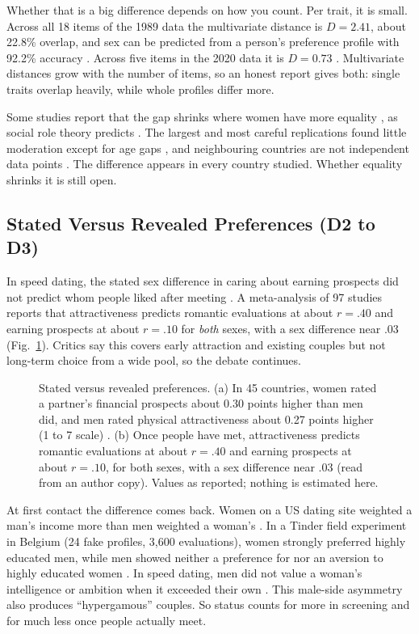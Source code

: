 \documentclass[conference,a4paper]{IEEEtran}
\begin{document}
Whether that is a big difference depends on how you count. Per trait, it is small. Across all 18 items of the 1989 data the multivariate distance is $D=2.41$, about 22.8\% overlap, and sex can be predicted from a person's preference profile with 92.2\% accuracy \cite{conroybeam2015}. Across five items in the 2020 data it is $D=0.73$ \cite{walter2020}. Multivariate distances grow with the number of items, so an honest report gives both: single traits overlap heavily, while whole profiles differ more.

Some studies report that the gap shrinks where women have more equality \cite{kasser1999,zentner2012}, as social role theory predicts \cite{eagly1999,wood2002}. The largest and most careful replications found little moderation except for age gaps \cite{zhang2019,walter2020}, and neighbouring countries are not independent data points \cite{gangestad2006}. The difference appears in every country studied. Whether equality shrinks it is still open.

\subsection{Stated Versus Revealed Preferences (D2 to D3)}
In speed dating, the stated sex difference in caring about earning prospects did not predict whom people liked after meeting \cite{eastwick2008}. A meta-analysis of 97 studies reports that attractiveness predicts romantic evaluations at about $r=.40$ and earning prospects at about $r=.10$ for \emph{both} sexes, with a sex difference near .03 \cite{eastwick2014} (Fig.~\ref{fig:stated}). Critics say this covers early attraction and existing couples but not long-term choice from a wide pool, so the debate continues.

\begin{figure}[t]
\centering

\caption{Stated versus revealed preferences. (a) In 45 countries, women rated a partner's financial prospects about 0.30 points higher than men did, and men rated physical attractiveness about 0.27 points higher (1 to 7 scale) \cite{walter2020}. (b) Once people have met, attractiveness predicts romantic evaluations at about $r=.40$ and earning prospects at about $r=.10$, for both sexes, with a sex difference near .03 \cite{eastwick2014} (read from an author copy). Values as reported; nothing is estimated here.}
\label{fig:stated}
\end{figure}

At first contact the difference comes back. Women on a US dating site weighted a man's income more than men weighted a woman's \cite{hitsch2010qme}. In a Tinder field experiment in Belgium (24 fake profiles, 3,600 evaluations), women strongly preferred highly educated men, while men showed neither a preference for nor an aversion to highly educated women \cite{neyt2019}. In speed dating, men did not value a woman's intelligence or ambition when it exceeded their own \cite{fisman2006}. This male-side asymmetry also produces ``hypergamous'' couples. So status counts for more in screening and for much less once people actually meet.
\end{document}
